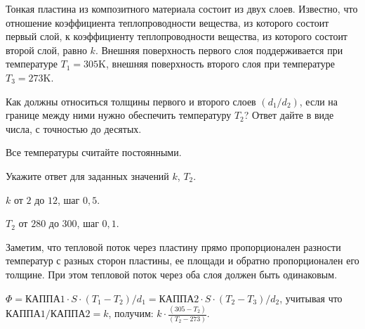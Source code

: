 
Тонкая пластина из композитного материала состоит из двух слоев. 
Известно, что отношение коэффициента теплопроводности вещества, из которого состоит первый слой, 
к коэффициенту теплопроводности вещества, из которого состоит второй слой, равно $k$. 
Внешняя поверхность первого слоя поддерживается при температуре \linebreak $T_1 = 305$K, внешняя поверхность 
второго слоя при температуре $T_3 = 273$K. 

Как должны относиться толщины первого и второго слоев $(d_1 / d_2)$, если на границе между ними нужно 
обеспечить температуру $T_2$? Ответ дайте в виде числа, с точностью до десятых. 

Все температуры считайте постоянными.

Укажите ответ для заданных значений $k$, $T_2$.

\paramSection

$k$ от $2$ до $12$, шаг $0,5$.

$T_2$ от $280$ до $300$, шаг $0,1$.

\solutionSection

Заметим, что тепловой поток через пластину прямо пропорционален разности температур с разных сторон пластины, 
ее площади и обратно пропорционален его толщине. При этом тепловой поток через оба слоя должен быть одинаковым.

$\Phi= \text{КАППА1} \cdot S \cdot (T_1-T_2)/d_1 = \text{КАППА2} \cdot S \cdot (T_2-T_3)/d_2$, учитывая что $\text{КАППА1}/ \text{КАППА2} = k$, получим: $k \cdot \frac{(305-T_2)}{(T_2-273)}$.

